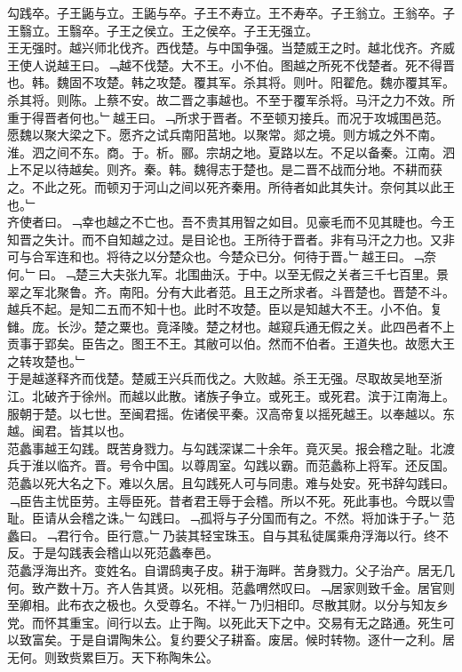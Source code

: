 \documentclass{zhvt-classic}
\begin{document}
\hspace*{2em}勾践卒。子王鼫与立。王鼫与卒。子王不寿立。王不寿卒。子王翁立。王翁卒。子王翳立。王翳卒。子王之侯立。王之侯卒。子王无强立。\\
\hspace*{2em}王无强时。越兴师北伐齐。西伐楚。与中国争强。当楚威王之时。越北伐齐。齐威王使人说越王曰。﹁越不伐楚。大不王。小不伯。图越之所死不伐楚者。死不得晋也。韩。魏固不攻楚。韩之攻楚。覆其军。杀其将。则叶。阳翟危。魏亦覆其军。杀其将。则陈。上蔡不安。故二晋之事越也。不至于覆军杀将。马汗之力不效。所重于得晋者何也。﹂越王曰。﹁所求于晋者。不至顿刃接兵。而况于攻城围邑范。愿魏以聚大梁之下。愿齐之试兵南阳莒地。以聚常。郯之境。则方城之外不南。淮。泗之间不东。商。于。析。郦。宗胡之地。夏路以左。不足以备秦。江南。泗上不足以待越矣。则齐。秦。韩。魏得志于楚也。是二晋不战而分地。不耕而获之。不此之死。而顿刃于河山之间以死齐秦用。所待者如此其失计。奈何其以此王也。﹂\\
\hspace*{2em}齐使者曰。﹁幸也越之不亡也。吾不贵其用智之如目。见豪毛而不见其睫也。今王知晋之失计。而不自知越之过。是目论也。王所待于晋者。非有马汗之力也。又非可与合军连和也。将待之以分楚众也。今楚众已分。何待于晋。﹂越王曰。﹁奈何。﹂曰。﹁楚三大夫张九军。北围曲沃。于中。以至无假之关者三千七百里。景翠之军北聚鲁。齐。南阳。分有大此者范。且王之所求者。斗晋楚也。晋楚不斗。越兵不起。是知二五而不知十也。此时不攻楚。臣以是知越大不王。小不伯。复雠。庞。长沙。楚之粟也。竟泽陵。楚之材也。越窥兵通无假之关。此四邑者不上贡事于郢矣。臣告之。图王不王。其敝可以伯。然而不伯者。王道失也。故愿大王之转攻楚也。﹂\\
\hspace*{2em}于是越遂释齐而伐楚。楚威王兴兵而伐之。大败越。杀王无强。尽取故吴地至浙江。北破齐于徐州。而越以此散。诸族子争立。或死王。或死君。滨于江南海上。服朝于楚。以七世。至闽君摇。佐诸侯平秦。汉高帝复以摇死越王。以奉越以。东越。闽君。皆其以也。\\
\hspace*{2em}范蠡事越王勾践。既苦身戮力。与勾践深谋二十余年。竟灭吴。报会稽之耻。北渡兵于淮以临齐。晋。号令中国。以尊周室。勾践以霸。而范蠡称上将军。还反国。范蠡以死大名之下。难以久居。且勾践死人可与同患。难与处安。死书辞勾践曰。﹁臣告主忧臣劳。主辱臣死。昔者君王辱于会稽。所以不死。死此事也。今既以雪耻。臣请从会稽之诛。﹂勾践曰。﹁孤将与子分国而有之。不然。将加诛于子。﹂范蠡曰。﹁君行令。臣行意。﹂乃装其轻宝珠玉。自与其私徒属乘舟浮海以行。终不反。于是勾践表会稽山以死范蠡奉邑。\\
\hspace*{2em}范蠡浮海出齐。变姓名。自谓鸱夷子皮。耕于海畔。苦身戮力。父子治产。居无几何。致产数十万。齐人告其贤。以死相。范蠡喟然叹曰。﹁居家则致千金。居官则至卿相。此布衣之极也。久受尊名。不祥。﹂乃归相印。尽散其财。以分与知友乡党。而怀其重宝。间行以去。止于陶。以死此天下之中。交易有无之路通。死生可以致富矣。于是自谓陶朱公。复约要父子耕畜。废居。候时转物。逐什一之利。居无何。则致赀累巨万。天下称陶朱公。\\
\end{document}
